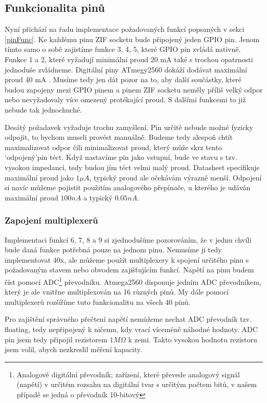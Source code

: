 \documentclass[11pt,a4paper,twoside,openright]{report}
\begin{document}
\subsection {Funkcionalita pinů}

Nyní přichází na řadu implementace požadovaných funkcí popsaných v sekci \ref{pinFunc}. Ke každému pinu ZIF socketu bude připojený jeden GPIO pin. Jenom tímto samo o sobě zajistíme funkce 3, 4, 5, které GPIO pin zvládá nativně. Funkce 1 a 2, které vyžadují minimální proud 20 mA také s trochou opatrnosti jednoduše zvládneme. Digitální piny ATmegy2560 dokáží dodávat maximální proud 40 mA \cite[str.~355]{atmega2560}. Musíme tedy jen dát pozor na to, aby další součástky, které budou zapojeny mezi GPIO pinem a pinem ZIF socketu neměly příliš velký odpor nebo nevyžadovaly více omezený protékající proud. S dalšími funkcemi to již nebude tak jednochuché.

Desátý požadavek vyžaduje trochu zamyšlení. Pin určitě nebude možné fyzicky odpojit, to bychom museli provést manuálně. Budeme tedy alespoň chtít maximalizovat odpor čili minimalizovat proud, který může skrz tento \lq odpojený\rq  pin téct. Když nastavíme pin jako vstupní, bude ve stavu s tzv. vysokou impedancí, tedy budou jím téct velmi malý proud. Datasheet specifikuje maximální proud jako $1 \mu  A$, typický proud ale očekávám výrazně menší. Odpojení si navíc můžeme pojistit použitím analogového přepínače, u kterého je udáván maximální proud $100nA$ a typický $0.05nA$.\cite[str.~3]{switch1}

\subsubsection {Zapojení multiplexerů}

Implementaci funkcí 6, 7, 8 a 9 si zjednodušíme pozorováním, že v jednu chvíli bude daná funkce potřebná pouze na jednom pinu. Nemusíme ji tedy implementovat 40x, ale můžeme použít multiplexery k spojení určitého pinu s požadovaným stavem nebo obvodem zajišťujícím funkcí. Napětí na pinu budem číst pomocí ADC\footnote{Analogově digitální převodník; zařízení, které převede analogový signál (napětí) v určitém rozsahu na digitální tvar s určitým počtem bitů, v našem případě se jedná o převodník 10-bitový} převodníku. Atmega2560 disponuje jedním ADC převodníkem, který je ale vnitřne multiplexován na 16 různých pinů. My dále pomocí multiplexerů rozšíříme tuto funkcionalitu na všech 40 pinů.

Pro zajištění správného přečtení napětí nemůžeme nechat ADC převodník tzv. floating, tedy nepřipojený k ničemu, kdy vrací víceméně náhodné hodnoty. ADC pin jsem tedy připojil rezistorem $1M\Omega$ k zemi. Takto vysokou hodnotu rezistoru jsem volil, abych nezkreslil měření kapacity.
\end{document}
